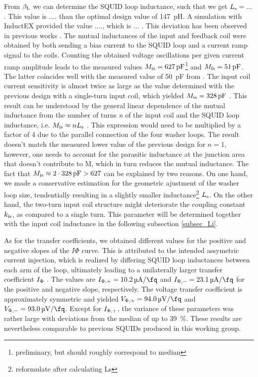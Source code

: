 From $\beta_{\rm L}$ we can determine the SQUID loop inductance, such that we get $L_{\rm s}=...$. This value is .... than the optimal design value of \qty{147}{\pico\henry}. A simulation with InductEX provided the value ...., which is ... . This deviation has been observed in previous works \cite{Ferring2015,Bauer2022}.
The mutual inductances of the input and feedback coil were obtained by both sending a bias current to the SQUID loop and a current ramp signal to the coils. Counting the obtained voltage oscillations per given current ramp amplitude leads to the measured values $M_{\rm is}=\qty{627}{\pico\farad}$\footnote{preliminary, but should roughly correspond to median} and $M_{\rm fs}=\qty{51}{\pico\farad}$. The latter coincides well with the measured value of \qty{50}{\pico\farad} from \cite{Bauer2022}. The input coil current sensitivity is almost twice as large as the value determined with the previous design with a single-turn input coil, which yielded $M_{\rm is}=\qty{328}{\pico\farad}$ \cite{Bauer2022}. This result can be understood by the general linear dependence of the mutual inductance from the number of turns \textit{n} of the input coil and the SQUID loop inductance, i.e. $M_{\rm is}\approx nL_{\rm s}$ \cite{Ketchen1981}. This expression would need to be multiplied by a factor of 4 due to the parallel connection of the four washer loops. The result doesn't match the measured lower value of the previous design for $n=1$, however, one needs to account for the parasitic inductance at the junction area that doesn't contribute to M, which in turn reduces the mutual inductance. The fact that $M_{\rm is}\approx 2\cdot \qty{328}{\pico\farad}>627$ can be explained by two reasons. On one hand, we made a conservative estimation for the geometric ajustment of the washer loop size, tendentially resulting in a slightly smaller inductance\footnote{reformulate after calculating Ls} $L_{\rm s}$. On the other hand, the two-turn input coil structure might deteriorate the coupling constant $k_{\rm is}$, as compared to a single turn. This parameter will be determined together with the input coil inductance in the following subsection \ref{subsec_Li}.

As for the transfer coefficients, we obtained different values for the positive and negative slopes of the $I\Phi$ curve. This is attributed to the intended assymetric current injection, which is realized by differing SQUID loop inductances between each arm of the loop, ultimately leading to a unilaterally larger transfer coefficient $I_{\rm \Phi}$ \cite{Ferring2015}. The values are $I_{\rm \Phi,+}=\qty{10.2}{\micro\ampere\per\fq}$ and $I_{\rm \Phi,-}=\qty{23.1}{\micro\ampere\per\fq}$ for the positive and negative slope, respectively. The voltage transfer coefficient is approximately symmetric and yielded $V_{\rm \Phi,+}=\qty{94.0}{\micro\volt\per\fq}$ and $V_{\rm \Phi,-}=\qty{93.0}{\micro\volt\per\fq}$. Except for $I_{\rm \Phi,+}$, the variance of these parameters was rather large with deviations from the median of up to \qty{39}{\percent}. These results are nevertheless comparable to previous SQUIDs produced in this working group.      


